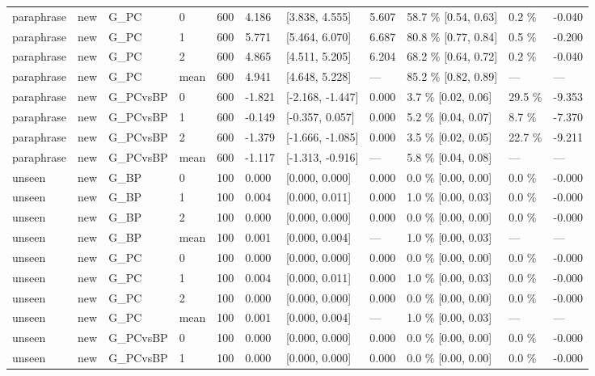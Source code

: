 \documentclass[10pt,a4paper]{article}
\begin{document}
\begin{center}
\begin{tabularx}{\textwidth}{@{}p{}XXXXXXXXXX@{}}
paraphrase & new & G\_PC & 0 & 600 & 4.186 & [3.838, 4.555] & 5.607 & 58.7 \% [0.54, 0.63] & 0.2 \% & -0.040 \\
paraphrase & new & G\_PC & 1 & 600 & 5.771 & [5.464, 6.070] & 6.687 & 80.8 \% [0.77, 0.84] & 0.5 \% & -0.200 \\
paraphrase & new & G\_PC & 2 & 600 & 4.865 & [4.511, 5.205] & 6.204 & 68.2 \% [0.64, 0.72] & 0.2 \% & -0.040 \\
paraphrase & new & G\_PC & mean & 600 & 4.941 & [4.648, 5.228] & — & 85.2 \% [0.82, 0.89] & — & — \\
paraphrase & new & G\_PCvsBP & 0 & 600 & -1.821 & [-2.168, -1.447] & 0.000 & 3.7 \% [0.02, 0.06] & 29.5 \% & -9.353 \\
paraphrase & new & G\_PCvsBP & 1 & 600 & -0.149 & [-0.357, 0.057] & 0.000 & 5.2 \% [0.04, 0.07] & 8.7 \% & -7.370 \\
paraphrase & new & G\_PCvsBP & 2 & 600 & -1.379 & [-1.666, -1.085] & 0.000 & 3.5 \% [0.02, 0.05] & 22.7 \% & -9.211 \\
paraphrase & new & G\_PCvsBP & mean & 600 & -1.117 & [-1.313, -0.916] & — & 5.8 \% [0.04, 0.08] & — & — \\
unseen & new & G\_BP & 0 & 100 & 0.000 & [0.000, 0.000] & 0.000 & 0.0 \% [0.00, 0.00] & 0.0 \% & -0.000 \\
unseen & new & G\_BP & 1 & 100 & 0.004 & [0.000, 0.011] & 0.000 & 1.0 \% [0.00, 0.03] & 0.0 \% & -0.000 \\
unseen & new & G\_BP & 2 & 100 & 0.000 & [0.000, 0.000] & 0.000 & 0.0 \% [0.00, 0.00] & 0.0 \% & -0.000 \\
unseen & new & G\_BP & mean & 100 & 0.001 & [0.000, 0.004] & — & 1.0 \% [0.00, 0.03] & — & — \\
unseen & new & G\_PC & 0 & 100 & 0.000 & [0.000, 0.000] & 0.000 & 0.0 \% [0.00, 0.00] & 0.0 \% & -0.000 \\
unseen & new & G\_PC & 1 & 100 & 0.004 & [0.000, 0.011] & 0.000 & 1.0 \% [0.00, 0.03] & 0.0 \% & -0.000 \\
unseen & new & G\_PC & 2 & 100 & 0.000 & [0.000, 0.000] & 0.000 & 0.0 \% [0.00, 0.00] & 0.0 \% & -0.000 \\
unseen & new & G\_PC & mean & 100 & 0.001 & [0.000, 0.004] & — & 1.0 \% [0.00, 0.03] & — & — \\
unseen & new & G\_PCvsBP & 0 & 100 & 0.000 & [0.000, 0.000] & 0.000 & 0.0 \% [0.00, 0.00] & 0.0 \% & -0.000 \\
unseen & new & G\_PCvsBP & 1 & 100 & 0.000 & [0.000, 0.000] & 0.000 & 0.0 \% [0.00, 0.00] & 0.0 \% & -0.000 \\

\end{tabularx}
\end{center}
\end{document}
